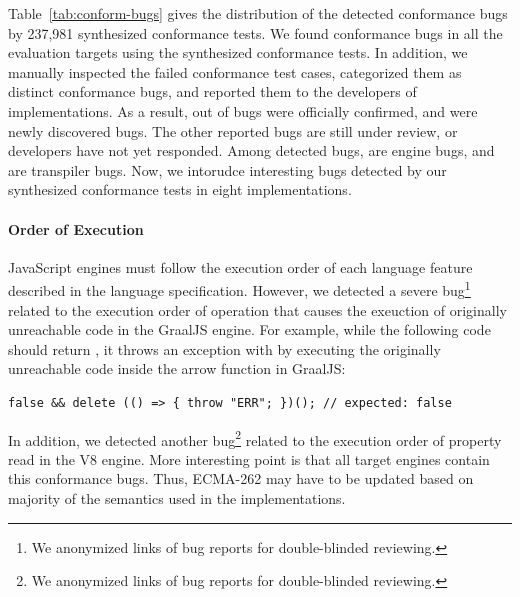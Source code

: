 
Table~\ref{tab:conform-bugs} gives the distribution of the detected conformance
bugs by 237,981 synthesized conformance tests.
%
We found conformance bugs in all the evaluation targets using the synthesized
conformance tests.
%
In addition, we manually inspected the failed conformance test cases,
categorized them as  distinct conformance bugs, and reported them to
the developers of implementations.
%
As a result,  out of  bugs were officially confirmed, and
 were newly discovered bugs.
%
The other  reported bugs are still under review, or developers have
not yet responded.
%
Among  detected bugs,  are engine bugs, and  are
transpiler bugs.
%
Now, we intorudce interesting bugs detected by our synthesized conformance
tests in eight implementations.


\paragraph{\textbf{Order of Execution}}
%
JavaScript engines must follow the execution order of each language feature
described in the language specification.
%
However, we detected a severe bug\footnote{
  We anonymized links of bug reports for double-blinded reviewing.
} related to the execution order of  operation that causes
the exeuction of originally unreachable code in the GraalJS engine.
%
For example, while the following code should return , it throws an
exception with  by executing the originally unreachable code
inside the arrow function in GraalJS:
%
\begin{lstlisting}[style=JS, basicstyle=\footnotesize\ttfamily]
false && delete (() => { throw "ERR"; })(); // expected: false
\end{lstlisting}
%
In addition, we detected another bug\footnote{
  We anonymized links of bug reports for double-blinded reviewing.
} related to the execution order of property read in the V8 engine.
%
%
%
More interesting point is that all target engines contain this conformance bugs.
%
Thus, ECMA-262 may have to be updated based on majority of the semantics used in
the implementations.

